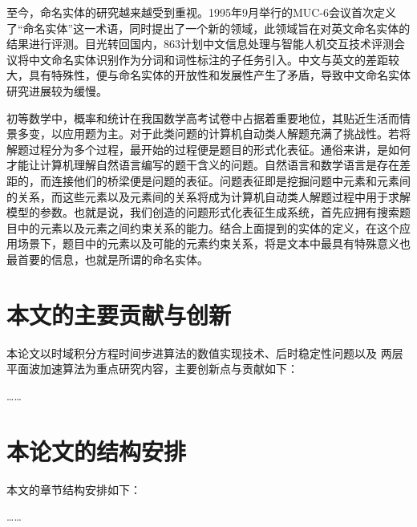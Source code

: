 至今，命名实体的研究越来越受到重视。1995年9月举行的MUC-6会议首次定义了“命名实体”这一术语，同时提出了一个新的领域，此领域旨在对英文命名实体的结果进行评测。目光转回国内，863计划中文信息处理与智能人机交互技术评测会议将中文命名实体识别作为分词和词性标注的子任务引入。中文与英文的差距较大，具有特殊性，便与命名实体的开放性和发展性产生了矛盾，导致中文命名实体研究进展较为缓慢。  

初等数学中，概率和统计在我国数学高考试卷中占据着重要地位，其贴近生活而情景多变，以应用题为主。对于此类问题的计算机自动类人解题充满了挑战性。若将解题过程分为多个过程，最开始的过程便是题目的形式化表征。通俗来讲，是如何才能让计算机理解自然语言编写的题干含义的问题。自然语言和数学语言是存在差距的，而连接他们的桥梁便是问题的表征。问题表征即是挖掘问题中元素和元素间的关系，而这些元素以及元素间的关系将成为计算机自动类人解题过程中用于求解模型的参数。也就是说，我们创造的问题形式化表征生成系统，首先应拥有搜索题目中的元素以及元素之间约束关系的能力。结合上面提到的实体的定义，在这个应用场景下，题目中的元素以及可能的元素约束关系，将是文本中最具有特殊意义也最首要的信息，也就是所谓的命名实体。  
\section{本文的主要贡献与创新}
本论文以时域积分方程时间步进算法的数值实现技术、后时稳定性问题以及
两层平面波加速算法为重点研究内容，主要创新点与贡献如下：

……
\section{本论文的结构安排}
本文的章节结构安排如下：

……
